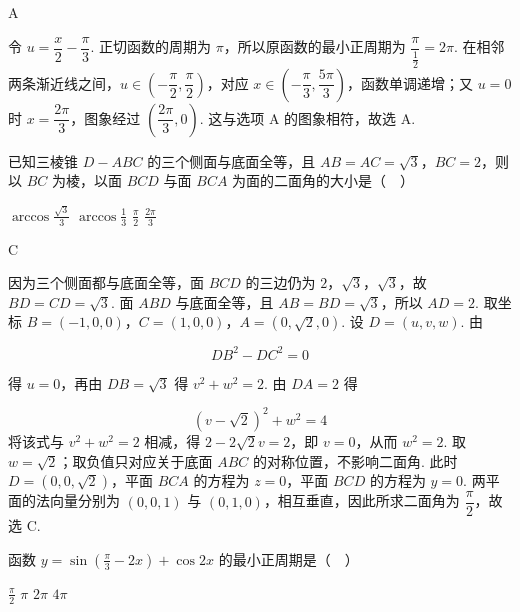 \documentclass[UTF8,a4paper,oneside,11pt]{ctexbook}
\begin{document}
\begin{answer}
A
\end{answer}

\begin{solution}
令 \(u=\dfrac{x}{2}-\dfrac{\pi}{3}\). 正切函数的周期为 \(\pi\)，所以原函数的最小正周期为 \(\dfrac{\pi}{\frac{1}{2}}=2\pi\). 在相邻两条渐近线之间，\(u\in\left(-\dfrac{\pi}{2},\dfrac{\pi}{2}\right)\)，对应 \(x\in\left(-\dfrac{\pi}{3},\dfrac{5\pi}{3}\right)\)，函数单调递增；又 \(u=0\) 时 \(x=\dfrac{2\pi}{3}\)，图象经过 \(\left(\dfrac{2\pi}{3},0\right)\). 这与选项 A 的图象相符，故选 A.
\end{solution}

\begin{problem}
已知三棱锥 \(D - ABC\) 的三个侧面与底面全等，且 \(AB = AC = \sqrt{3}\)，\(BC = 2\)，则以 \(BC\) 为棱，以面 \(BCD\) 与面 \(BCA\) 为面的二面角的大小是（\(\quad\)）

\choices
    {\(\arccos \frac{\sqrt{3}}{3}\)}
    {\(\arccos \frac{1}{3}\)}
    {\(\frac{\pi}{2}\)}
    {\(\frac{2\pi}{3}\)}
\end{problem}

\begin{answer}
C
\end{answer}

\begin{solution}
因为三个侧面都与底面全等，面 \(BCD\) 的三边仍为 \(2\)，\(\sqrt{3}\)，\(\sqrt{3}\)，故 \(BD=CD=\sqrt{3}\). 面 \(ABD\) 与底面全等，且 \(AB=BD=\sqrt{3}\)，所以 \(AD=2\). 取坐标 \(B=(-1,0,0)\)，\(C=(1,0,0)\)，\(A=(0,\sqrt{2},0)\). 设 \(D=(u,v,w)\). 由

\[
DB^{2}-DC^{2}=0
\]

得 \(u=0\)，再由 \(DB=\sqrt{3}\) 得 \(v^{2}+w^{2}=2\). 由 \(DA=2\) 得

\[
(v-\sqrt{2})^{2}+w^{2}=4
\]
将该式与 \(v^{2}+w^{2}=2\) 相减，得 \(2-2\sqrt{2}v=2\)，即 \(v=0\)，从而 \(w^{2}=2\). 取 \(w=\sqrt{2}\)；取负值只对应关于底面 \(ABC\) 的对称位置，不影响二面角. 此时 \(D=(0,0,\sqrt{2})\)，平面 \(BCA\) 的方程为 \(z=0\)，平面 \(BCD\) 的方程为 \(y=0\). 两平面的法向量分别为 \((0,0,1)\) 与 \((0,1,0)\)，相互垂直，因此所求二面角为 \(\dfrac{\pi}{2}\)，故选 C.
\end{solution}

\begin{problem}
函数 \(y = \sin \left(\frac{\pi}{3} - 2x\right) + \cos 2x\) 的最小正周期是（\(\quad\)）

\choices
    {\(\frac{\pi}{2}\)}
    {\(\pi\)}
    {\(2\pi\)}
    {\(4\pi\)}
\end{problem}
\end{document}
